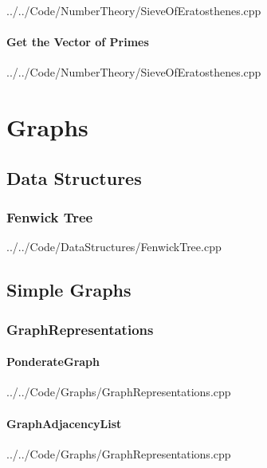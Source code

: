 \documentclass[11pt, fleqn]{report}                             %
\theoremstyle{break}                                            %
\begin{document}
\begin{multicols}{2}
                
                {../../Code/NumberTheory/SieveOfEratosthenes.cpp}

                \vfill\null
                \columnbreak

            \subsection{Get the Vector of Primes}

                
                {../../Code/NumberTheory/SieveOfEratosthenes.cpp}

\part{Graphs}

\chapter{Data Structures}

    \section{Fenwick Tree}
        
        {../../Code/DataStructures/FenwickTree.cpp}

\chapter{Simple Graphs}

    \section{GraphRepresentations}

        \subsection{PonderateGraph}
            
            {../../Code/Graphs/GraphRepresentations.cpp}

            \vfill\null
            \columnbreak

        \subsection{GraphAdjacencyList}
            
            {../../Code/Graphs/GraphRepresentations.cpp}
            

\end{multicols}
\end{document}
